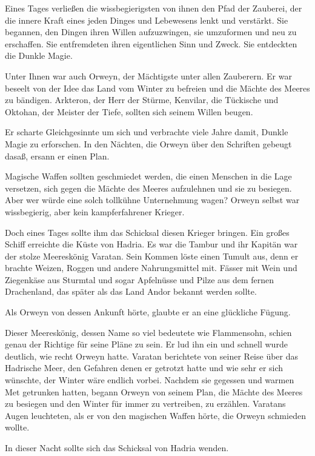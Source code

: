 \documentclass[10pt, a4paper, oneside]{book}
\begin{document}
\begin{multicols}{2}
Eines Tages verließen die wissbegierigsten von ihnen den Pfad der Zauberei, der die innere Kraft eines jeden Dinges und Lebewesens lenkt und verstärkt. Sie begannen, den Dingen ihren Willen aufzuzwingen, sie umzuformen und neu zu erschaffen. Sie entfremdeten ihren eigentlichen Sinn und Zweck. Sie entdeckten die Dunkle Magie.\bigskip

Unter Ihnen war auch Orweyn, der Mächtigste unter allen Zauberern. Er war beseelt von der Idee das Land vom Winter zu befreien und die Mächte des Meeres zu bändigen. Arkteron, der Herr der Stürme, Kenvilar, die Tückische und Oktohan, der Meister der Tiefe, sollten sich seinem Willen beugen.\bigskip

Er scharte Gleichgesinnte um sich und verbrachte viele Jahre damit, Dunkle Magie zu erforschen. In den Nächten, die Orweyn über den Schriften gebeugt dasaß, ersann er einen Plan.\bigskip

Magische Waffen sollten geschmiedet werden, die einen Menschen in die Lage versetzen, sich gegen die Mächte des Meeres aufzulehnen und sie zu besiegen. Aber wer würde eine solch tollkühne Unternehmung wagen? Orweyn selbst war wissbegierig, aber kein kampferfahrener Krieger.\bigskip

Doch eines Tages sollte ihm das Schicksal diesen Krieger bringen. Ein großes Schiff erreichte die Küste von Hadria. Es war die Tambur und ihr Kapitän war der stolze Meereskönig Varatan. Sein Kommen löste einen Tumult aus, denn er brachte Weizen, Roggen und andere Nahrungsmittel mit. Fässer mit Wein und Ziegenkäse aus Sturmtal und sogar Apfelnüsse und Pilze aus dem fernen Drachenland, das später als das Land Andor bekannt werden sollte.\bigskip

Als Orweyn von dessen Ankunft hörte, glaubte er an eine glückliche Fügung.\bigskip

Dieser Meereskönig, dessen Name so viel bedeutete wie Flammensohn, schien genau der Richtige für seine Pläne zu sein. Er lud ihn ein und schnell wurde deutlich, wie recht Orweyn hatte. Varatan berichtete von seiner Reise über das Hadrische Meer, den Gefahren denen er getrotzt hatte und wie sehr er sich wünschte, der Winter wäre endlich vorbei. Nachdem sie gegessen und warmen Met getrunken hatten, begann Orweyn von seinem Plan, die Mächte des Meeres zu besiegen und den Winter für immer zu vertreiben, zu erzählen. Varatans Augen leuchteten, als er von den magischen Waffen hörte, die Orweyn schmieden wollte.\bigskip

In dieser Nacht sollte sich das Schicksal von Hadria wenden.\bigskip




\end{multicols}
\end{document}
